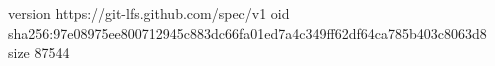 version https://git-lfs.github.com/spec/v1
oid sha256:97e08975ee800712945c883dc66fa01ed7a4c349ff62df64ca785b403c8063d8
size 87544
